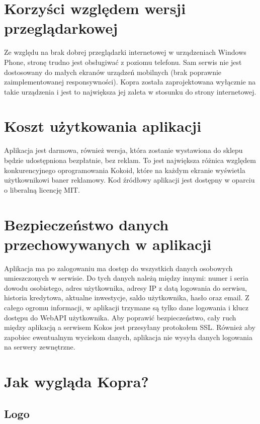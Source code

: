 \documentclass[a4paper,twoside,titlepage,openright]{book}
\begin{document}
\section{Korzyści względem wersji przeglądarkowej}

Ze względu na brak dobrej przeglądarki internetowej w urządzeniach Windows Phone, stronę trudno jest obsługiwać z poziomu telefonu. Sam serwis nie jest dostosowany do małych ekranów urządzeń mobilnych (brak poprawnie zaimplementowanej responsywności). Kopra została zaprojektowana wyłącznie na takie urządzenia i jest to największa jej zaleta w stosunku do strony internetowej. 


\section{Koszt użytkowania aplikacji}

Aplikacja jest darmowa, również wersja, która zostanie wystawiona do sklepu będzie udostępniona bezpłatnie, bez reklam. To jest największa różnica względem konkurencyjnego oprogramowania Kokoid, które na każdym ekranie wyświetla użytkownikowi baner reklamowy. Kod źródłowy aplikacji jest dostępny w oparciu o liberalną licencję MIT.

\section{Bezpieczeństwo danych przechowywanych w aplikacji}

Aplikacja ma po zalogowaniu ma dostęp do wszystkich danych osobowych umieszczonych w serwisie. Do tych danych należą między innymi: numer i seria dowodu osobistego, adres użytkownika, adresy IP z datą logowania do serwisu, historia kredytowa, aktualne inwestycje, saldo użytkownika, hasło oraz email. Z całego ogromu informacji, w aplikacji trzymane są tylko dane logowania i klucz dostępu do WebAPI użytkownika. Aby poprawić bezpieczeństwo, cały ruch między aplikacją a serwisem Kokos jest przesyłany protokołem SSL. Również aby zapobiec ewentualnym wyciekom danych, aplikacja nie wysyła danych logowania na serwery zewnętrzne.

\section{Jak wygląda Kopra?}

\subsection{Logo}
\end{document}
